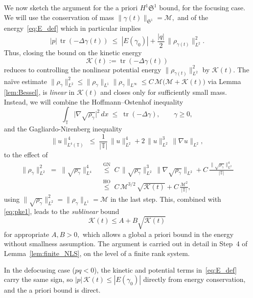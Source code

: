 \documentclass[11pt]{amsart}
\theoremstyle{definition}
\newcommand{\T}{\mathbb{T}}
\newcommand{\Sp}{\mathfrak{S}}
\DeclareMathOperator{\tr}{tr}
\begin{document}
We now sketch the argument for the a priori $H^1\Sp^1$ bound, for the focusing case. We will use the conservation of mass $\|\gamma(t)\|_{\Sp^1}=\mathcal{M},$ and of the energy~\eqref{eq:E_def} which in particular implies
\begin{equation}\label{eq:pke1}
  |p|\,\tr(-\Delta\gamma(t))
  \;\le\; |E(\gamma_0)| + \frac{|q|}{2}\,\|\rho_{\gamma(t)}\|_{L^2}^2.
\end{equation}
Thus, closing the bound on the kinetic energy
\[
\mathcal{K}(t):=\tr(-\Delta\gamma(t))
\] 
reduces to controlling the nonlinear potential energy $\|\rho_{\gamma(t)}\|_{L^2}^2$ by  $\mathcal{K}(t)$. The na\"ive estimate $\|\rho_\gamma\|_{L^2}^2\le\|\rho_\gamma\|_{L^1}\|\rho_\gamma\|_{L^\infty}\le C\,\mathcal{M}\bigl(\mathcal{M}+\mathcal{K}(t)\bigr)$ via Lemma \ref{lem:Bessel}, is \emph{linear} in $\mathcal{K}(t)$ and closes only for sufficiently small mass.
Instead, we will  combine the  Hoffmann--Ostenhof inequality~\cite{HoffmannOstenhof1977}
\[
  \int_\T\bigl|\nabla\sqrt{\rho_\gamma}\bigr|^2\,dx
  \;\le\;
  \tr(-\Delta\gamma),
  \qquad \gamma\ge 0,
\]
and the Gagliardo-Nirenberg inequality
\[
  \|u\|_{L^4(\T)}^{\,4}
  \;\le\; \frac{1}{|\T|}\,\|u\|_{L^2}^4 + 2\,\|u\|_{L^2}^3\,\|\nabla u\|_{L^2},
\]
to the effect of\begin{align*}
  \|\rho_\gamma\|_{L^2}^2 \;=\; \|\sqrt{\rho_\gamma}\|_{L^4}^4
  &\;\stackrel{\text{GN}}{\le}\;
  C\,\|\sqrt{\rho_\gamma}\|_{L^2}^3\,\|\nabla\sqrt{\rho_\gamma}\|_{L^2}
  + C\,\frac{\|\sqrt{\rho_\gamma}\|_{L^2}^4}{|\T|}\\
  &\;\stackrel{\text{HO}}{\le}\;
  C\,\mathcal{M}^{3/2}\,\sqrt{\mathcal{K}(t)}
  + C\,\frac{\mathcal{M}^2}{|\T|},
\end{align*}
using $\|\sqrt{\rho_\gamma}\|_{L^2}^2=\|\rho_\gamma\|_{L^1}=\mathcal{M}$ in the last step.
This, combined with \eqref{eq:pke1}, leads to the \emph{sublinear} bound
\[
\mathcal{K}(t) \le A + B \sqrt{\mathcal{K}(t)}
\]
for appropriate $A,B>0,$
which allows a global a priori bound in the energy without smallness assumption.
The argument is carried out in detail in Step~4 of Lemma~\ref{lem:finite_NLS}, on the level of a finite rank system.


In the defocusing case ($pq<0$), the kinetic and potential terms in~\eqref{eq:E_def} carry the same sign, so $|p|\,\mathcal{K}(t)\le|E(\gamma_0)|$ directly from energy conservation, and the a priori bound is direct.
\end{document}
